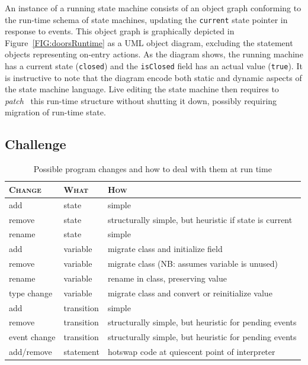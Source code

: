 \documentclass[english,submission]{programming}
\begin{document}
An instance of a running state machine consists of an object graph conforming to the run-time schema of state machines, updating the \lstinline{current} state pointer in response to events. This object graph is graphically depicted in Figure~\ref{FIG:doorsRuntime} as a UML object diagram, excluding the statement objects representing on-entry actions. As the diagram shows, the running machine has a current state (\lstinline{closed}) and the \lstinline{isClosed} field has an actual value (\lstinline{true}). It is instructive to note that the diagram encode both static and dynamic aspects of the state machine language. Live editing the state machine then requires to \textit{patch}~\cite{SemanticDeltas} this run-time structure without shutting it down, possibly requiring migration of run-time state.

\subsection{Challenge}

\begin{table}[t]
  \centering
\begin{tabular}{lll}\toprule
\textsc{Change} & \textsc{What} & \textsc{How}\\\midrule
add & state & simple  \\
remove & state & structurally simple, but heuristic if state is current \\
rename & state & simple\\
add & variable & migrate class and initialize field \\
remove & variable & migrate class (NB: assumes variable is unused)\\
rename & variable & rename in class, preserving value\\
type change & variable & migrate class and convert or reinitialize value \\
add & transition & simple \\
remove & transition & structurally simple, but heuristic for pending events\\
event change & transition & structurally simple, but heuristic for pending events\\
add/remove & statement & hotswap code at quiescent point of interpreter\\
\bottomrule
\end{tabular}
\caption{Possible program changes and how to deal with them at run time}
\label{tbl:smchanges}
\end{table}
\end{document}
